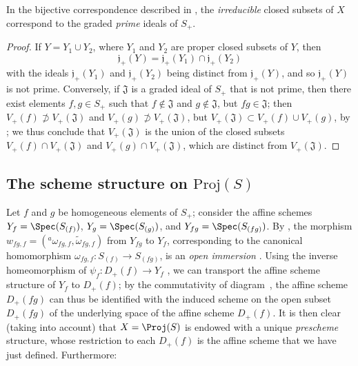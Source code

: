 \begin{corollary}[2.3.17]
\label{II.2.3.17}
In the bijective correspondence described in , the \emph{irreducible} closed subsets of $X$ correspond to the graded \emph{prime} ideals of $S_+$.
\end{corollary}

\begin{proof}
If $Y=Y_1\cup Y_2$, where $Y_1$ and $Y_2$ are proper closed subsets of $Y$, then
\[
  \mathfrak{j}_+(Y) = \mathfrak{j}_+(Y_1)\cap\mathfrak{j}_+(Y_2)
\]
with the ideals $\mathfrak{j}_+(Y_1)$ and $\mathfrak{j}_+(Y_2)$ being distinct from $\mathfrak{j}_+(Y)$, and so $\mathfrak{j}_+(Y)$ is not prime.
Conversely, if $\mathfrak{J}$ is a graded ideal of $S_+$ that is not prime, then there exist elements $f,g\in S_+$ such that $f\not\in\mathfrak{J}$ and $g\not\in\mathfrak{J}$, but $fg\in\mathfrak{J}$;
then $V_+(f)\not\supset V_+(\mathfrak{J})$ and $V_+(g)\not\supset V_+(\mathfrak{J})$, but $V_+(\mathfrak{J})\subset V_+(f)\cup V_+(g)$, by ;
we thus conclude that $V_+(\mathfrak{J})$ is the union of the closed subsets $V_+(f)\cap V_+(\mathfrak{J})$ and $V_+(g)\cap V_+(\mathfrak{J})$, which are distinct from $V_+(\mathfrak{J})$.
\end{proof}


\subsection{The scheme structure on $\mathrm{Proj}(S)$}
\label{subsection:II.2.4}

\begin{env}[2.4.1]
\label{II.2.4.1}
Let $f$ and $g$ be homogeneous elements of $S_+$;
consider the affine schemes $Y_f=\Spec(S_{(f)})$, $Y_g=\Spec(S_{(g)})$, and $Y_{fg}=\Spec(S_{(fg)})$.
By , the morphism $w_{fg,f} = ({}^a\!\omega_{fg,f},\widetilde{\omega}_{fg,f})$ from $Y_{fg}$ to $Y_f$, corresponding to the canonical homomorphism $\omega_{fg,f}: S_{(f)}\to S_{(fg)}$, is an \emph{open immersion} .
Using the inverse homeomorphism of $\psi_f: D_+(f)\to Y_f$ , we can transport the affine scheme structure of $Y_f$ to $D_+(f)$;
by the commutativity of diagram~, the affine scheme $D_+(fg)$ can thus be identified with the induced scheme on the open subset $D_+(fg)$ of the underlying space of the affine scheme $D_+(f)$.
It is then clear (taking  into account) that $X=\Proj(S)$ is endowed with a unique \emph{prescheme} structure, whose restriction to each $D_+(f)$ is the affine scheme that we have just defined.
Furthermore:
\end{env}

